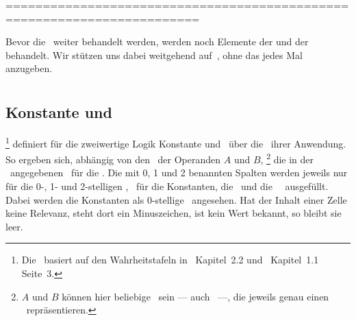 ========================================================================

Bevor die \Schlussregeln\ weiter behandelt werden, werden noch Elemente der \emph{\Aussagenlogik} und der \emph{\Praedikatenlogik} behandelt.
Wir stützen uns dabei weitgehend auf~\cite{bib:Rautenberg}, ohne das jedes Mal anzugeben.

\section[Aussagenlogik]{\Aussagenlogik}%
\beginsection          {\Aussagenlogik}
\label              {sec-Aussagenlogik}

\color{gray}%
\subsection[Konstante und Operationen]{Konstante und \Operationen}%
\label               {sub-Operationen}

%
\footnote{%
	Die \tablename\ basiert auf den Wahrheitstafeln in~\cite{bib:JunktorMoeglich} Kapitel~2.2 und~\cite{bib:Rautenberg} Kapitel~1.1 Seite~3.
}
definiert für die zweiwertige Logik Konstante und \Junktoren\ über die \Wahrheitswerte\ ihrer Anwendung.
So ergeben sich, abhängig von den \Wahrheitswerten\ der Operanden $A$ und $B$,%
\footnote{%
	$A$ und $B$ können hier beliebige \Aussagen\ sein --- auch \Formeln\ ---, die jeweils genau einen \Wahrheitswert\ repräsentieren.
}
die in der \tablename\ angegebenen \Wahrheitswerte\ für die \Operationen.
Die mit 0, 1 und 2 benannten Spalten werden jeweils nur für die 0-, 1- und 2-stelligen \Junktoren, \textdh\ für die Konstanten, die \unaeren\ und die \binaeren\ \Junktoren\ ausgefüllt.
Dabei werden die Konstanten als 0-stellige \Junktoren\ angesehen.
Hat der Inhalt einer Zelle keine Relevanz, steht dort ein Minuszeichen, ist kein Wert bekannt, so bleibt sie leer.

